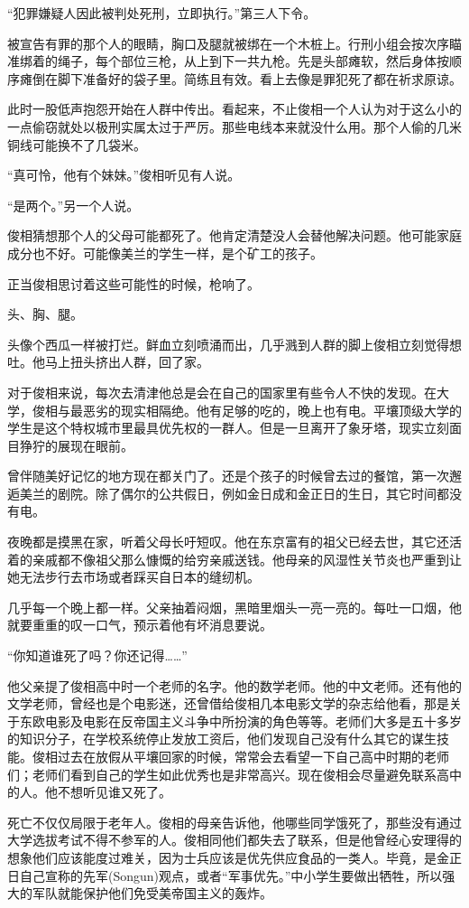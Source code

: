“犯罪嫌疑人因此被判处死刑，立即执行。”第三人下令。

被宣告有罪的那个人的眼睛，胸口及腿就被绑在一个木桩上。行刑小组会按次序瞄准绑着的绳子，每个部位三枪，从上到下一共九枪。先是头部瘫软，然后身体按顺序瘫倒在脚下准备好的袋子里。简练且有效。看上去像是罪犯死了都在祈求原谅。

此时一股低声抱怨开始在人群中传出。看起来，不止俊相一个人认为对于这么小的一点偷窃就处以极刑实属太过于严厉。那些电线本来就没什么用。那个人偷的几米铜线可能换不了几袋米。

“真可怜，他有个妹妹。”俊相听见有人说。

“是两个。”另一个人说。

俊相猜想那个人的父母可能都死了。他肯定清楚没人会替他解决问题。他可能家庭成分也不好。可能像美兰的学生一样，是个矿工的孩子。

正当俊相思讨着这些可能性的时候，枪响了。

头、胸、腿。

头像个西瓜一样被打烂。鲜血立刻喷涌而出，几乎溅到人群的脚上俊相立刻觉得想吐。他马上扭头挤出人群，回了家。

对于俊相来说，每次去清津他总是会在自己的国家里有些令人不快的发现。在大学，俊相与最恶劣的现实相隔绝。他有足够的吃的，晚上也有电。平壤顶级大学的学生是这个特权城市里最具优先权的一群人。但是一旦离开了象牙塔，现实立刻面目狰狞的展现在眼前。

曾伴随美好记忆的地方现在都关门了。还是个孩子的时候曾去过的餐馆，第一次邂逅美兰的剧院。除了偶尔的公共假日，例如金日成和金正日的生日，其它时间都没有电。

夜晚都是摸黑在家，听着父母长吁短叹。他在东京富有的祖父已经去世，其它还活着的亲戚都不像祖父那么慷慨的给穷亲戚送钱。他母亲的风湿性关节炎也严重到让她无法步行去市场或者踩买自日本的缝纫机。

几乎每一个晚上都一样。父亲抽着闷烟，黑暗里烟头一亮一亮的。每吐一口烟，他就要重重的叹一口气，预示着他有坏消息要说。

“你知道谁死了吗？你还记得……”

他父亲提了俊相高中时一个老师的名字。他的数学老师。他的中文老师。还有他的文学老师，曾经也是个电影迷，还曾借给俊相几本电影文学的杂志给他看，那是关于东欧电影及电影在反帝国主义斗争中所扮演的角色等等。老师们大多是五十多岁的知识分子，在学校系统停止发放工资后，他们发现自己没有什么其它的谋生技能。俊相过去在放假从平壤回家的时候，常常会去看望一下自己高中时期的老师们；老师们看到自己的学生如此优秀也是非常高兴。现在俊相会尽量避免联系高中的人。他不想听见谁又死了。

死亡不仅仅局限于老年人。俊相的母亲告诉他，他哪些同学饿死了，那些没有通过大学选拔考试不得不参军的人。俊相同他们都失去了联系，但是他曾经心安理得的想象他们应该能度过难关，因为士兵应该是优先供应食品的一类人。毕竟，是金正日自己宣称的先军(Songun)观点，或者“军事优先。”中小学生要做出牺牲，所以强大的军队就能保护他们免受美帝国主义的轰炸。

